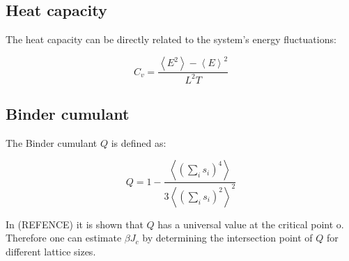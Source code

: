 \documentclass[twoside]{article}
\def\mean#1{\left< #1 \right>}
\begin{document}
\begin{multicols}{2}
\subsection{Heat capacity}
The heat capacity can be directly related to the system's energy fluctuations:

\begin{equation}
C_v = \frac{\mean{E^2} - \mean{E}^2}{L^2 T}
\end{equation}

\subsection{Binder cumulant}
The Binder cumulant $Q$ is defined as:

\begin{equation}
Q = 1 - \frac{\mean{\left( \sum_i s_i \right)^4}}{3 \mean{\left( \sum_i s_i \right)^2}^2}
\end{equation}

In (REFENCE) it is shown that $Q$ has a universal value at the critical point o. Therefore one can estimate $\beta J_c$ by determining the intersection point of $Q$ for different lattice sizes.


\end{multicols}
\end{document}
